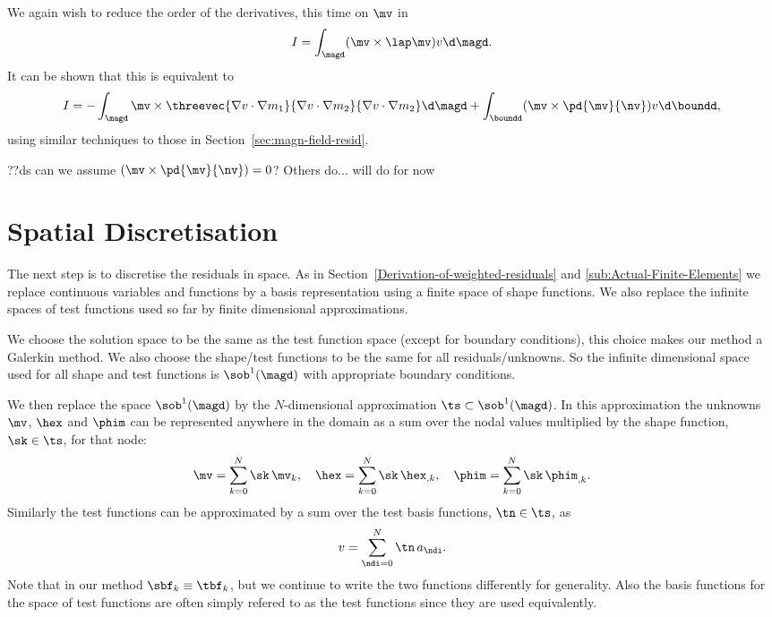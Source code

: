 We again wish to reduce the order of the derivatives, this time on $\mv$ in
\begin{equation}
  I = \int_\magd (\mv \times \lap \mv) v \d\magd.
  \label{eq:46}
\end{equation}
It can be shown that this is equivalent to
\begin{equation}
  \label{eq:49}
  I = - \int_\magd  \mv \times \threevec{\nabla v \cdot \nabla m_1}{\nabla v \cdot \nabla m_2}{\nabla v \cdot \nabla m_2} \d\magd + \int_\boundd (\mv \times \pd{\mv}{\nv}) v \d\boundd,
\end{equation}
using similar techniques to those in Section~\ref{sec:magn-field-resid}. %

??ds can we assume $(\mv \times \pd{\mv}{\nv}) = 0$? Others do... will do for now

\section{Spatial Discretisation}
\label{sec:spat-discr-resi}

The next step is to discretise the residuals in space. As in Section~\ref{Derivation-of-weighted-residuals} and \ref{sub:Actual-Finite-Elements} we replace continuous variables and functions by a basis representation using a finite space of shape functions. We also replace the infinite spaces of test functions used so far by finite dimensional approximations.

We choose the solution space to be the same as the test function space (except for boundary conditions), this choice makes our method a Galerkin method. We also choose the shape/test functions to be the same for all residuals/unknowns. So the infinite dimensional space used for all shape and test functions is $\sob^1(\magd)$ with appropriate boundary conditions.

We then replace the space $\sob^1(\magd)$ by the $N$-dimensional approximation $\ts \subset \sob^1(\magd)$. In this approximation the unknowns $\mv$, $\hex$ and $\phim$ can be represented anywhere in the domain as a sum over the nodal values multiplied by the shape function, $\sk \in \ts$, for that node:
\begin{gather} %
  \mv = \sum_{k = 0}^{N} \sk \, \mv_k, \quad
  \hex = \sum_{k = 0}^{N} \sk \, \hex_{,k}, \quad
  \phim = \sum_{k = 0}^{N} \sk \, \phim_{,k}.
  \label{eq:unknowns-basis}
\end{gather}
Similarly the test functions can be approximated by a sum over the test basis functions, $\tn \in \ts$, as
\begin{equation}
  \label{eq:47}
  v = \sum_{\ndi = 0}^{N} \tn \, a_\ndi.
\end{equation}
Note that in our method $\sbf_k \equiv \tbf_k$, but we continue to write the two functions differently for generality. Also the basis functions for the space of test functions are often simply refered to as the test functions since they are used equivalently.

